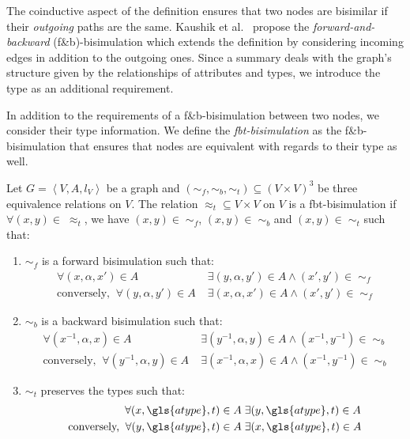 The coinductive aspect of the definition ensures that two nodes are bisimilar if their \emph{outgoing} paths are the same. Kaushik et al.~\cite{kaushik:2002:cib} propose the \emph{forward-and-backward} (f\&b)-bisimulation which extends the definition by considering incoming edges in addition to the outgoing ones. Since a summary deals with the graph's structure given by the relationships of attributes and types, we introduce the type as an additional requirement.

In addition to the requirements of a f\&b-bisimulation between two nodes, we consider their type information. We define the \emph{fbt-bisimulation} as the f\&b-bisimulation that ensures that nodes are equivalent with regards to their type as well.

\begin{definition}
Let $G=\left\langle V, A, l_V \right\rangle$ be a graph and $(\sim_f, \sim_b, \sim_t) \subseteq (V \times V)^3$ be three equivalence relations on $V$.
The relation $\approx_t \subseteq V \times V$ on $V$ is a fbt-bisimulation if $\forall (x,y) \in\; \approx_t$, we have $(x,y) \in\; \sim_f$, $(x,y) \in\; \sim_b$ and $(x,y) \in\; \sim_t$ such that:
\begin{enumerate}
\item $\sim_f$ is a forward bisimulation such that:
$$
\begin{aligned}
\forall (x, \alpha, x') \in A&\; \exists (y, \alpha, y') \in A \wedge (x',y') \in\; \sim_f \\
\text{conversely,}\;\; \forall (y, \alpha, y') \in A&\; \exists (x, \alpha, x') \in A \wedge (x',y') \in\; \sim_f
\end{aligned}
$$

\item $\sim_b$ is a backward bisimulation such that:
$$
\begin{aligned}
\forall (x^{-1}, \alpha, x) \in A&\; \exists (y^{-1}, \alpha, y) \in A \wedge (x^{-1}, y^{-1}) \in\; \sim_b \\
\text{conversely,}\;\; \forall (y^{-1}, \alpha, y) \in A&\; \exists (x^{-1}, \alpha, x) \in A \wedge (x^{-1}, y^{-1}) \in\; \sim_b
\end{aligned}
$$

\item $\sim_t$ preserves the types such that:
$$
\begin{aligned}
\forall (x, \gls{atype}, t) \in A&\; \exists (y, \gls{atype}, t) \in A \\
\text{conversely,}\;\; \forall (y, \gls{atype}, t) \in A&\; \exists (x, \gls{atype}, t) \in A
\end{aligned}
$$

\end{enumerate}
\end{definition}

